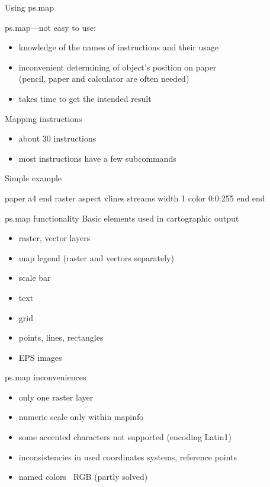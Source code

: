 \documentclass[xcolor=dvipsnames,beamer,compress]{beamer} %
\newcommand{\roztazeneradky}{%
\renewcommand{\baselinestretch}{1.3}%
\selectfont
}
\begin{document}
\begin{frame}{Using ps.map}
\roztazeneradky
\begin{block}{ps.map---not easy to use:}
\begin{itemize}
\item knowledge of the names of instructions and their usage
\item inconvenient determining of object's position on paper\\
(pencil, paper and calculator are often needed)
\item takes time to get the intended result
\end{itemize}
\end{block}
\end{frame}


\begin{frame}[fragile]{Mapping instructions}
\begin{itemize}
  \item about 30 instructions
  \item most instructions have a few subcommands
\end{itemize}

\begin{block}{Simple example}
\begin{psmap}
  paper a4
      end
  raster aspect
  vlines streams
      width 1
      color 0:0:255
      end
  end
\end{psmap}
\end{block}
\end{frame}


\begin{frame}{ps.map functionality}
Basic elements used in cartographic output
\begin{itemize}
  \item raster, vector layers
  \item map legend (raster and vectors separately)
  \item scale bar
  \item text
  \item grid
  \item points, lines, rectangles
  \item EPS images
\end{itemize}

\end{frame}

\begin{frame}{ps.map inconveniences}
 \roztazeneradky
\begin{itemize}
\item only one raster layer
\item numeric scale only within mapinfo
\item some accented characters not supported (encoding Latin1)
\item inconsistencies in used coordinates systems, reference points
\item named colors \texttimes\ RGB (partly solved)

\end{itemize}

\end{frame}
\end{document}
